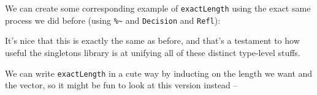 \documentclass[]{article}
\newenvironment{Shaded}{}{}
\newcommand{\KeywordTok}[1]{\textcolor[rgb]{0.00,0.44,0.13}{\textbf{#1}}}
\newcommand{\DataTypeTok}[1]{\textcolor[rgb]{0.56,0.13,0.00}{#1}}
\newcommand{\CommentTok}[1]{\textcolor[rgb]{0.38,0.63,0.69}{\textit{#1}}}
\newcommand{\OtherTok}[1]{\textcolor[rgb]{0.00,0.44,0.13}{#1}}
\newcommand{\FunctionTok}[1]{\textcolor[rgb]{0.02,0.16,0.49}{#1}}
\newcommand{\NormalTok}[1]{#1}
\begin{document}
We can create some corresponding example of \texttt{exactLength} using the exact
same process we did before (using \texttt{\%\textasciitilde{}} and
\texttt{Decision} and \texttt{Refl}):

\begin{Shaded}
\end{Shaded}

It's nice that this is exactly the same as before, and that's a testament to how
useful the singletons library is at unifying all of these distinct type-level
stuffs.

We can write \texttt{exactLength} in a cute way by inducting on the length we
want and the vector, so it might be fun to look at this version instead --
\end{document}
